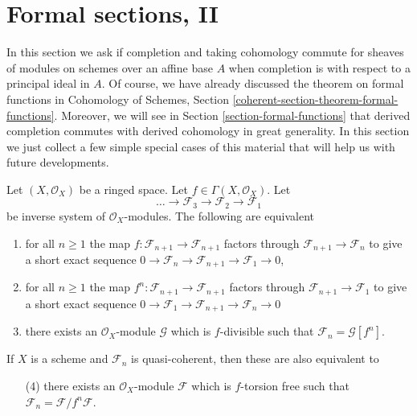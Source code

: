 \section{Formal sections, II}
\label{section-formal-functions-principal}

\noindent
In this section we ask if completion and taking cohomology commute
for sheaves of modules on schemes over an affine base $A$ when completion
is with respect to a principal ideal in $A$. Of course, we have already
discussed the theorem on formal functions in
Cohomology of Schemes, Section \ref{coherent-section-theorem-formal-functions}.
Moreover, we will see in Section \ref{section-formal-functions}
that derived completion commutes with derived cohomology in great generality.
In this section we just collect a few simple special cases of this material
that will help us with future developments.

\begin{lemma}
\label{lemma-equivalent-f-good}
Let $(X, \mathcal{O}_X)$ be a ringed space.
Let $f \in \Gamma(X, \mathcal{O}_X)$. Let
$$
\ldots \to \mathcal{F}_3 \to \mathcal{F}_2 \to \mathcal{F}_1
$$
be inverse system of $\mathcal{O}_X$-modules.
The following are equivalent
\begin{enumerate}
\item for all $n \geq 1$ the map
$f : \mathcal{F}_{n + 1} \to \mathcal{F}_{n + 1}$ factors
through $\mathcal{F}_{n + 1} \to \mathcal{F}_n$ to give a
short exact sequence
$0 \to \mathcal{F}_n \to \mathcal{F}_{n + 1} \to \mathcal{F}_1 \to 0$,
\item for all $n \geq 1$ the map
$f^n : \mathcal{F}_{n + 1} \to \mathcal{F}_{n + 1}$
factors through $\mathcal{F}_{n + 1} \to \mathcal{F}_1$
to give a short exact sequence
$0 \to \mathcal{F}_1 \to \mathcal{F}_{n + 1} \to \mathcal{F}_n \to 0$
\item there exists an $\mathcal{O}_X$-module $\mathcal{G}$
which is $f$-divisible such that $\mathcal{F}_n = \mathcal{G}[f^n]$.
\end{enumerate}
If $X$ is a scheme and $\mathcal{F}_n$ is quasi-coherent, then these
are also equivalent to
\begin{enumerate}
\item[(4)] there exists an $\mathcal{O}_X$-module $\mathcal{F}$
which is $f$-torsion free such that
$\mathcal{F}_n = \mathcal{F}/f^n\mathcal{F}$.
\end{enumerate}
\end{lemma}

